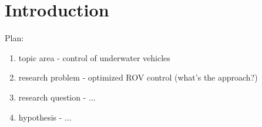 \chapter{Introduction}
\label{chap:intro}

Plan:
\begin{enumerate}
    \item topic area - control of underwater vehicles
    \item research problem - optimized ROV control (what's the approach?)
    \item research question - ...
    \item hypothesis - ...
\end{enumerate}





